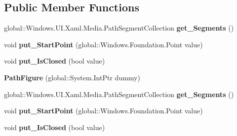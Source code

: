 \subsection*{Public Member Functions}
\begin{DoxyCompactItemize}
\item 
\mbox{\label{class_windows_1_1_u_i_1_1_xaml_1_1_media_1_1_path_figure_a55e9274133a7e70428e1a1774744c831}} 
global\+::\+Windows.\+U\+I.\+Xaml.\+Media.\+Path\+Segment\+Collection {\bfseries get\+\_\+\+Segments} ()
\item 
\mbox{\label{class_windows_1_1_u_i_1_1_xaml_1_1_media_1_1_path_figure_a98a6c923093988529a0c002b45fcc964}} 
void {\bfseries put\+\_\+\+Start\+Point} (global\+::\+Windows.\+Foundation.\+Point value)
\item 
\mbox{\label{class_windows_1_1_u_i_1_1_xaml_1_1_media_1_1_path_figure_a7f73c57c9048ef1ca00f9c30c01a6267}} 
void {\bfseries put\+\_\+\+Is\+Closed} (bool value)
\item 
\mbox{\label{class_windows_1_1_u_i_1_1_xaml_1_1_media_1_1_path_figure_abe2e7b79407ea8e704a56a4bb2d8ecf2}} 
{\bfseries Path\+Figure} (global\+::\+System.\+Int\+Ptr dummy)
\item 
\mbox{\label{class_windows_1_1_u_i_1_1_xaml_1_1_media_1_1_path_figure_a55e9274133a7e70428e1a1774744c831}} 
global\+::\+Windows.\+U\+I.\+Xaml.\+Media.\+Path\+Segment\+Collection {\bfseries get\+\_\+\+Segments} ()
\item 
\mbox{\label{class_windows_1_1_u_i_1_1_xaml_1_1_media_1_1_path_figure_a98a6c923093988529a0c002b45fcc964}} 
void {\bfseries put\+\_\+\+Start\+Point} (global\+::\+Windows.\+Foundation.\+Point value)
\item 
\mbox{\label{class_windows_1_1_u_i_1_1_xaml_1_1_media_1_1_path_figure_a7f73c57c9048ef1ca00f9c30c01a6267}} 
void {\bfseries put\+\_\+\+Is\+Closed} (bool value)

\end{DoxyCompactItemize}
